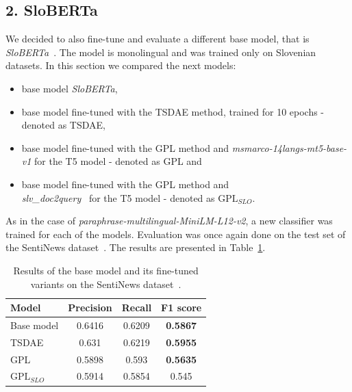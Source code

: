 \documentclass[fleqn,moreauthors,10pt]{ds_report}
\begin{document}

\subsection*{\large{2. SloBERTa}}
We decided to also fine-tune and evaluate a different base model, that is {\it SloBERTa}~\cite{sloberta}. The model is monolingual and was trained only on Slovenian datasets. In this section we compared the next models:
\begin{itemize}
	\item base model {\it SloBERTa},
	\item base model fine-tuned with the TSDAE method, trained for 10 epochs - denoted as TSDAE,
	\item base model fine-tuned with the GPL method and {\it msmarco-14langs-mt5-base-v1} \cite{msmarco14langs} for the T5 model - denoted as GPL and
	\item base model fine-tuned with the GPL method and \\{\it slv\_doc2query}~\cite{boshko} for the T5 model - denoted as $\text{GPL}_{SLO}$.
\end{itemize}

As in the case of {\it paraphrase-multilingual-MiniLM-L12-v2}, a new classifier was trained for each of the models. Evaluation was once again done on the test set of the SentiNews dataset~\cite{sentiNews}. The results are presented in Table~\ref{tab4}.

\begin{table}[!h]
	\footnotesize
	\begin{center}
		\begin{tabular}{ |l|c|c|c| }
		\hline
		\rowcolor{Blue}Model & Precision & Recall & F1 score\\
		\hline

		Base model & 0.6416 & 0.6209 & \textbf{0.5867}\\
		\hline
		TSDAE & 0.631 & 0.6219 & \textbf{0.5955}\\
		\hline
		GPL & 0.5898 & 0.593 & \textbf{0.5635}\\
		$\text{GPL}_{SLO}$ & 0.5914 & 0.5854 & 0.545\\

		\hline
		\end{tabular}
	\end{center}
\caption{Results of the base model and its fine-tuned variants on the SentiNews dataset~\cite{sentiNews}.}
\label{tab4}
\end{table}
\end{document}
